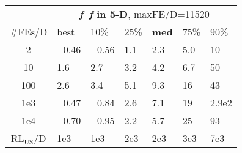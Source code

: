 \begin{tabular}{c|llllll}
 & \multicolumn{6}{|c}{\textbf{\textit{f}\raisebox{-0.35ex}{1}--\textit{f}\raisebox{-0.35ex}{24} in 5-D}, maxFE/D=11520}\\
\#FEs/D & best & 10\% & 25\% & \textbf{med} & 75\% & 90\%\\
2 & ~\,0.46 & ~\,0.56 & \hspace*{1ex}1.1 & \hspace*{1ex}2.3 & \hspace*{1ex}5.0 & 10\\
10 & \hspace*{1ex}1.6 & \hspace*{1ex}2.7 & \hspace*{1ex}3.2 & \hspace*{1ex}4.2 & \hspace*{1ex}6.7 & 50\\
100 & \hspace*{1ex}2.6 & \hspace*{1ex}3.4 & \hspace*{1ex}5.1 & \hspace*{1ex}9.3 & 16 & 43\\
1e3 & ~\,0.47 & ~\,0.84 & \hspace*{1ex}2.6 & \hspace*{1ex}7.1 & 19 & 2.9e2\\
1e4 & ~\,0.70 & ~\,0.95 & \hspace*{1ex}2.2 & \hspace*{1ex}5.7 & 25 & 93\\
$\text{RL}_{\text{US}}$/D & 1e3 & 1e3 & 2e3 & 2e3 & 3e3 & 7e3
\end{tabular}

